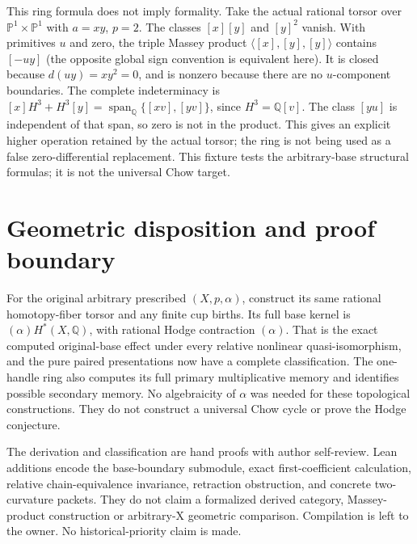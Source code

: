 \documentclass[11pt]{article}
\newcommand{\Q}{\mathbb Q}
\begin{document}
This ring formula does not imply formality. Take the actual rational
torsor over $\mathbb P^1\times\mathbb P^1$ with $a=xy$, $p=2$. The
classes $[x][y]$ and $[y]^2$ vanish. With primitives $u$ and zero,
the triple Massey product $\langle[x],[y],[y]\rangle$ contains
$[-uy]$ (the opposite global sign convention is equivalent here).
It is closed because $d(uy)=xy^2=0$, and is nonzero because there are no
$u$-component boundaries. The complete indeterminacy is
$[x]H^3+H^3[y]=\operatorname{span}_\Q\{[xv],[yv]\}$, since
$H^3=\Q[v]$. The class $[yu]$ is independent of that span, so zero is
not in the product. This gives an explicit higher operation retained by
the actual torsor; the ring is not being used as a false zero-differential
replacement. This fixture tests the arbitrary-base structural formulas;
it is not the universal Chow target.

\section{Geometric disposition and proof boundary}
For the original arbitrary prescribed $(X,p,\alpha)$, construct its same
rational homotopy-fiber torsor and any finite cup births. Its full base
kernel is $(\alpha)H^*(X,\Q)$, with rational Hodge contraction $(\alpha)$.
That is the exact computed original-base effect under every relative
nonlinear quasi-isomorphism, and the pure paired presentations now have
a complete classification. The one-handle ring also computes its full
primary multiplicative memory and identifies possible secondary memory.
No algebraicity of $\alpha$ was needed for these topological constructions.
They do not construct a universal Chow cycle or prove the Hodge conjecture.

The derivation and classification are hand proofs with author self-review.
Lean additions encode the base-boundary submodule, exact first-coefficient
calculation, relative chain-equivalence invariance, retraction obstruction,
and concrete two-curvature packets. They do not claim a formalized derived
category, Massey-product construction or arbitrary-X geometric comparison.
Compilation is left to the owner. No historical-priority claim is made.
\end{document}
